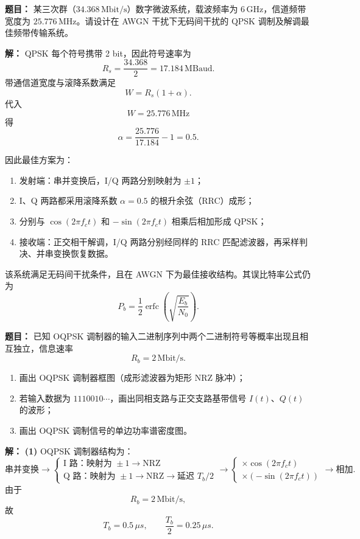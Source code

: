 \medskip
{}
\textbf{题目：}
某三次群（$34.368\,\mathrm{Mbit/s}$）数字微波系统，载波频率为 $6\,\mathrm{GHz}$，信道频带宽度为 $25.776\,\mathrm{MHz}$。请设计在 AWGN 干扰下无码间干扰的 QPSK 调制及解调最佳频带传输系统。

\par\textbf{解：}
QPSK 每个符号携带 2 bit，因此符号速率为
\[
R_s=\frac{34.368}{2}=17.184\,\mathrm{MBaud}.
\]
带通信道宽度与滚降系数满足
\[
W=R_s(1+\alpha).
\]
代入
\[
W=25.776\,\mathrm{MHz}
\]
得
\[
\alpha=\frac{25.776}{17.184}-1=0.5.
\]

因此最佳方案为：
\begin{enumerate}
\item 发射端：串并变换后，I/Q 两路分别映射为 $\pm1$；
\item I、Q 两路都采用滚降系数 $\alpha=0.5$ 的根升余弦（RRC）成形；
\item 分别与 $\cos(2\pi f_ct)$ 和 $-\sin(2\pi f_ct)$ 相乘后相加形成 QPSK；
\item 接收端：正交相干解调，I/Q 两路分别经同样的 RRC 匹配滤波器，再采样判决、并串变换恢复数据。
\end{enumerate}

该系统满足无码间干扰条件，且在 AWGN 下为最佳接收结构。其误比特率公式仍为
\[
P_b=\frac12\operatorname{erfc}\!\left(\sqrt{\frac{E_b}{N_0}}\right).
\]

\medskip
{}
\textbf{题目：}
已知 OQPSK 调制器的输入二进制序列中两个二进制符号等概率出现且相互独立，信息速率
\[
R_b=2\,\mathrm{Mbit/s}.
\]
\begin{enumerate}
\item 画出 OQPSK 调制器框图（成形滤波器为矩形 NRZ 脉冲）；
\item 若输入数据为 $1110010\cdots$，画出同相支路与正交支路基带信号 $I(t)$、$Q(t)$ 的波形；
\item 画出 OQPSK 调制信号的单边功率谱密度图。
\end{enumerate}

\par\textbf{解：}
\textbf{(1)} OQPSK 调制器结构为：
\[
\text{串并变换}
\rightarrow
\begin{cases}
\text{I 路：映射为 }\pm1 \rightarrow \text{NRZ}\\
\text{Q 路：映射为 }\pm1 \rightarrow \text{NRZ} \rightarrow \text{延迟 }T_b/2
\end{cases}
\rightarrow
\begin{cases}
\times \cos(2\pi f_ct)\\
\times (-\sin(2\pi f_ct))
\end{cases}
\rightarrow
\text{相加}.
\]
由于
\[
R_b=2\,\mathrm{Mbit/s},
\]
故
\[
T_b=0.5\,\mu s,
\qquad
\frac{T_b}{2}=0.25\,\mu s.
\]

